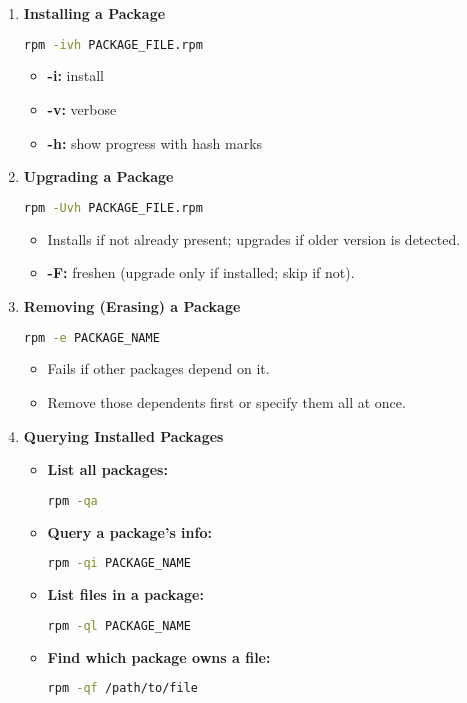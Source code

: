 \documentclass[12pt,a4paper]{report}
\begin{document}
\begin{enumerate}
    \item \textbf{Installing a Package}
\begin{lstlisting}[language=bash]
rpm -ivh PACKAGE_FILE.rpm
\end{lstlisting}
\begin{itemize}
    \item \textbf{-i:} install
    \item \textbf{-v:} verbose
    \item \textbf{-h:} show progress with hash marks
\end{itemize}

\item \textbf{Upgrading a Package}
\begin{lstlisting}[language=bash]
rpm -Uvh PACKAGE_FILE.rpm
\end{lstlisting}
\begin{itemize}
    \item Installs if not already present; upgrades if older version is detected.
    \item \textbf{-F:} freshen (upgrade only if installed; skip if not).
\end{itemize}

\item \textbf{Removing (Erasing) a Package}
\begin{lstlisting}[language=bash]
rpm -e PACKAGE_NAME
\end{lstlisting}
\begin{itemize}
    \item Fails if other packages depend on it.
    \item Remove those dependents first or specify them all at once.
\end{itemize}

\item \textbf{Querying Installed Packages}
\begin{itemize}
    \item \textbf{List all packages:}
    \begin{lstlisting}[language=bash]
rpm -qa
    \end{lstlisting}
    \item \textbf{Query a package’s info:}
    \begin{lstlisting}[language=bash]
rpm -qi PACKAGE_NAME
    \end{lstlisting}
    \item \textbf{List files in a package:}
    \begin{lstlisting}[language=bash]
rpm -ql PACKAGE_NAME
    \end{lstlisting}
    \item \textbf{Find which package owns a file:}
    \begin{lstlisting}[language=bash]
rpm -qf /path/to/file
    \end{lstlisting}
\end{itemize}


\end{enumerate}
\end{document}
